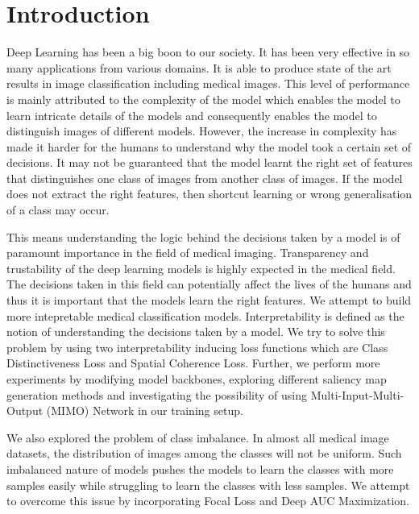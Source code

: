 \chapter{Introduction}
\ifpdf
    \graphicspath{{Introduction/IntroductionFigs/PNG/}{Introduction/IntroductionFigs/PDF/}{Introduction/IntroductionFigs/}}
\else
    \graphicspath{{Introduction/IntroductionFigs/EPS/}{Introduction/IntroductionFigs/}}
\fi

Deep Learning has been a big boon to our society. It has been very effective in so many applications from various domains. It is able to produce state of the art results in image classification including medical images. This level of performance is mainly attributed to the complexity of the model which enables the model to learn intricate details of the models and consequently enables the model to distinguish images of different models. However, the increase in complexity has made it harder for the humans to understand why the model took a certain set of decisions. It may not be guaranteed that the model learnt the right set of features that distinguishes one class of images from another class of images. If the model does not extract the right features, then shortcut learning or wrong generalisation of
a class may occur.

This means understanding the logic behind the decisions taken by a model is of paramount importance in the field of medical imaging. Transparency and trustability of the deep learning models is highly expected in the medical field. The decisions taken in this field can potentially affect the lives of the humans and thus it is important that the models learn the right features. We attempt to build more intepretable medical classification models. Interpretability is defined as the notion of understanding the decisions taken by a model. We try to solve this problem by using two interpretability inducing loss functions which are Class Distinctiveness Loss and Spatial Coherence Loss. Further, we perform more experiments by modifying model backbones, exploring different saliency map generation methods and investigating the possibility of using Multi-Input-Multi-Output (MIMO) Network in our training setup.

We also explored the problem of class imbalance. In almost all medical image datasets, the distribution of images among the classes will not be uniform. Such imbalanced nature of models pushes the models to learn the classes with more samples easily while struggling to learn the classes with less samples. We attempt to overcome this issue by incorporating Focal Loss and Deep AUC Maximization.

